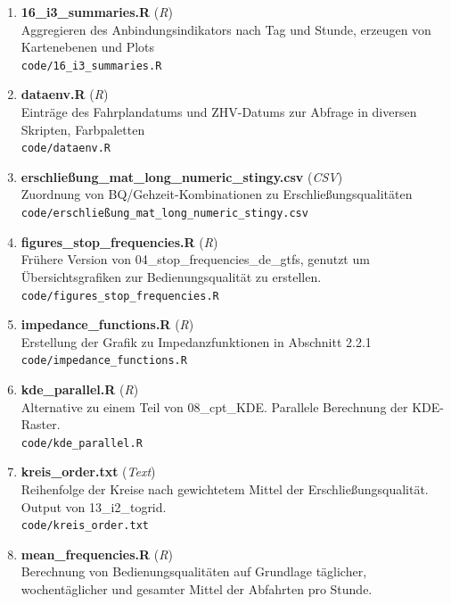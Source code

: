\begin{enumerate}[label=\arabic*., leftmargin=*, itemsep=0.5em, topsep=0.3em]
\begin{enumerate}[label=\arabic{enumi}.\arabic*, leftmargin=*, itemsep=0.5em, topsep=0.3em]
Identifizieren kürzester Wegzeiten, Berechnung des Anbindungsindikators je Stunde\\
\texttt{\small code/15\_i3\_shortest\_times.R}
\item \textbf{16\_i3\_summaries.R} \textnormal{(\textit{R})}\\
Aggregieren des Anbindungsindikators nach Tag und Stunde, erzeugen von Kartenebenen und Plots\\
\texttt{\small code/16\_i3\_summaries.R}
\item \textbf{dataenv.R} \textnormal{(\textit{R})}\\
Einträge des Fahrplandatums und ZHV-Datums zur Abfrage in diversen Skripten, Farbpaletten\\
\texttt{\small code/dataenv.R}
\item \textbf{erschließung\_mat\_long\_numeric\_stingy.csv} \textnormal{(\textit{CSV})}\\
Zuordnung von BQ/Gehzeit-Kombinationen zu Erschließungsqualitäten\\
\texttt{\small code/erschließung\_mat\_long\_numeric\_stingy.csv}
\item \textbf{figures\_stop\_frequencies.R} \textnormal{(\textit{R})}\\
Frühere Version von 04\_stop\_frequencies\_de\_gtfs, genutzt um Übersichtsgrafiken zur Bedienungsqualität zu erstellen.\\
\texttt{\small code/figures\_stop\_frequencies.R}
\item \textbf{impedance\_functions.R} \textnormal{(\textit{R})}\\
Erstellung der Grafik zu Impedanzfunktionen in Abschnitt 2.2.1\\
\texttt{\small code/impedance\_functions.R}
\item \textbf{kde\_parallel.R} \textnormal{(\textit{R})}\\
Alternative zu einem Teil von 08\_cpt\_KDE. Parallele Berechnung der KDE-Raster.\\
\texttt{\small code/kde\_parallel.R}
\item \textbf{kreis\_order.txt} \textnormal{(\textit{Text})}\\
Reihenfolge der Kreise nach gewichtetem Mittel der Erschließungsqualität. Output von 13\_i2\_togrid.\\
\texttt{\small code/kreis\_order.txt}
\item \textbf{mean\_frequencies.R} \textnormal{(\textit{R})}\\
Berechnung von Bedienungsqualitäten auf Grundlage täglicher, wochentäglicher und gesamter Mittel der Abfahrten pro Stunde.\\

\end{enumerate}
\end{enumerate}
